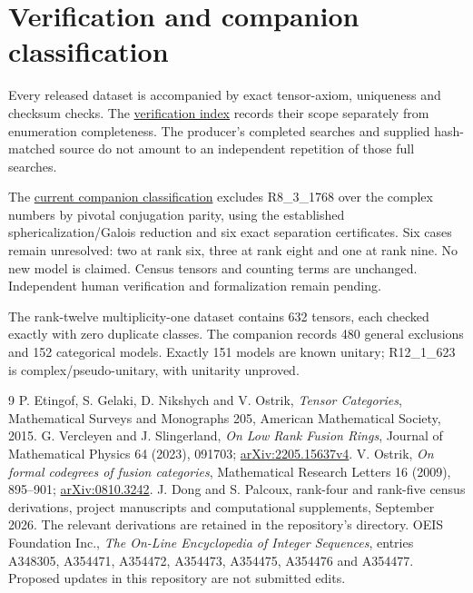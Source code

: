 \documentclass[11pt,a4paper]{article}
\theoremstyle{definition}\newtheorem{definition}[theorem]{Definition}\newtheorem{remark}[theorem]{Remark}
\begin{document}
\section{Verification and companion classification}

Every released dataset is accompanied by exact tensor-axiom, uniqueness and
checksum checks. The \href{https://github.com/sebastienpalcoux/fusion-ring-census/blob/main/verification/README.md}{verification index}
records their scope separately from enumeration completeness. The producer's
completed searches and supplied hash-matched source do not amount to an
independent repetition of those full searches.

The \href{https://github.com/sebastienpalcoux/grothendieck-ring-classification/blob/main/evidence/frontier/README.md}{current companion classification}
excludes R8\_3\_1768 over the complex numbers by pivotal conjugation parity,
using the established sphericalization/Galois reduction and six exact
separation certificates. Six cases remain unresolved: two at rank six, three at rank eight and one at rank nine. No new model is claimed. Census
tensors and counting terms are unchanged. Independent human verification
and formalization remain pending.

The rank-twelve multiplicity-one dataset contains 632 tensors, each checked
exactly with zero duplicate classes. The companion records 480 general
exclusions and 152 categorical models. Exactly 151 models are known unitary;
R12\_1\_623 is complex/pseudo-unitary, with unitarity unproved.

\begin{thebibliography}{9}\footnotesize\setlength{\itemsep}{0pt}\setlength{\parskip}{0pt}
 P. Etingof, S. Gelaki, D. Nikshych and V. Ostrik,
\emph{Tensor Categories}, Mathematical Surveys and Monographs 205,
American Mathematical Society, 2015.
 G. Vercleyen and J. Slingerland,
\emph{On Low Rank Fusion Rings}, Journal of Mathematical Physics 64 (2023),
091703; \href{https://arxiv.org/abs/2205.15637v4}{arXiv:2205.15637v4}.
 V. Ostrik, \emph{On formal codegrees of fusion categories},
Mathematical Research Letters 16 (2009), 895--901;
\href{https://arxiv.org/abs/0810.3242}{arXiv:0810.3242}.
 J. Dong and S. Palcoux, rank-four and rank-five census derivations,
project manuscripts and computational supplements, September 2026.
The relevant derivations are retained in the repository's  directory.
 OEIS Foundation Inc., \emph{The On-Line Encyclopedia of Integer
Sequences}, entries A348305, A354471, A354472, A354473, A354475, A354476
and A354477. Proposed updates in this repository are not submitted edits.
\end{thebibliography}
\end{document}
